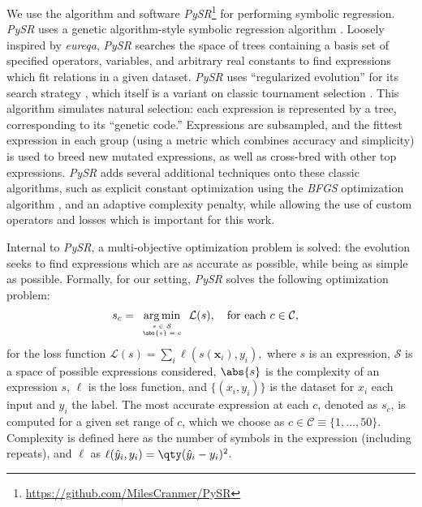 \documentclass[nohyperref]{article}
\newcommand\pysr{\textit{PySR}\xspace}
\theoremstyle{plain}
\theoremstyle{definition}
\theoremstyle{remark}
\begin{document}
We use the algorithm and software \pysr\footnote{\url{https://github.com/MilesCranmer/PySR}} \cite{cranmerPySRFastParallelized2020} for performing symbolic regression.
\pysr uses a genetic algorithm-style symbolic regression algorithm
\citep[see][for an early example]{kozaGeneticProgrammingMeans1994}.
Loosely inspired by \textit{eureqa},
\pysr searches the space of trees 
containing a basis set of specified operators, variables, and arbitrary real constants
to find expressions which fit relations in a given dataset.
\pysr uses ``regularized evolution'' for its search strategy 
\cite{realRegularizedEvolutionImage2019,realAutoMLZeroEvolvingMachine2020},
which itself is a variant on classic tournament selection
\cite{brindleGeneticAlgorithmsFunction1980,goldbergComparativeAnalysisSelection1991}.
This algorithm simulates natural selection: each expression is represented by a tree, corresponding to its ``genetic code.''
Expressions are subsampled, and the fittest expression in each group (using a metric which combines accuracy and simplicity) is used to breed new mutated expressions, as well as cross-bred with other top expressions.
\pysr adds several additional techniques onto these classic algorithms, such as explicit constant optimization using the \textit{BFGS} optimization algorithm \cite{fletcherPracticalMethodsOptimization1988}, and an adaptive complexity penalty, while allowing the use of custom operators and losses which is important for this work.

Internal to \pysr, a multi-objective optimization problem is solved: the evolution seeks to find expressions which are as accurate as possible, while being as simple as possible.
Formally, for our setting, \pysr solves the following optimization problem:
\begin{align}
    s_c &= 
        \mathop{\arg\min}_{
            \tiny
            \begin{array}{c}s\in\mathcal{S}\\ \abs{s} = c \end{array}
        }
        \mathcal{L}(s),
    \quad\text{for each } c\in \mathcal{C},
\end{align}
for the loss function $\mathcal{L}(s) = \sum_i \ell(s(\mathbf{x}_i), y_i),$
where $s$ is an expression, 
$\mathcal{S}$ is a space of possible expressions considered,
$\abs{s}$ is the complexity of an expression $s$,
$\ell$ is the loss function, and $\{(x_i, y_i)\}$ is the dataset
for $x_i$ each input and $y_i$ the label.
The most accurate expression at each $c$, denoted as $s_c$, is computed for a given set range of $c$, which we choose as $c\in\mathcal{C}\equiv \{1, \ldots, 50\}$.
Complexity is defined here
as the number of symbols in the expression (including repeats),
and $\ell$ as $\ell(\hat{y}_i, y_i) = \qty(\hat{y}_i - y_i)^2$.
\end{document}
